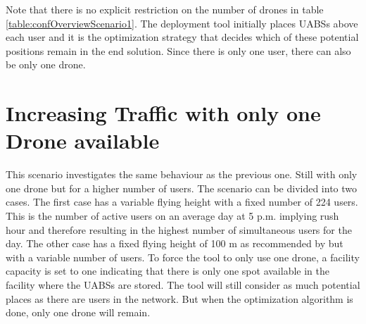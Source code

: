 Note that there is no explicit restriction on the number of drones in table \ref{table:confOverviewScenario1}. The deployment tool initially places 
\gls{UABS}s above each user and it is the optimization strategy that decides which of these potential positions remain in the end solution.
Since there is only one user, there can also be only one drone.




\section{Increasing Traffic with only one Drone available}

This scenario investigates the same behaviour  as the previous one. Still with only one drone but for a higher number of users. 
The scenario can be divided into two cases. The first case has a variable 
flying height with a fixed number of 224 users. This is the number of active users on an average day at 5 p.m. implying rush hour and therefore 
resulting in the highest number of simultaneous users for the day\cite{J2}. The other 
case has a fixed flying height of 100 m as recommended by \cite{J2} but with a variable number of users. To force the tool to only use one drone, a facility capacity is set to one 
indicating that there is only one spot available in the facility where the \gls{UABS}s are stored. The tool will still consider as much potential places 
as there are users in the network. But when the optimization algorithm is done, only one drone will remain.

